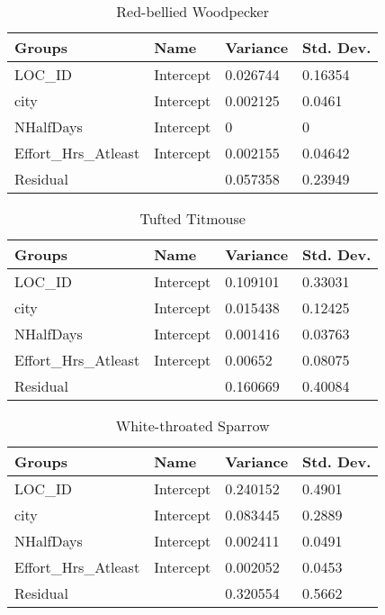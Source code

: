 \begin{longtable}[c]{|l|l|l|l|}
\caption{Red-bellied Woodpecker}
\label{my-label}\\
\hline
Groups               & Name      & Variance & Std. Dev. \\ \hline
\endhead
%
LOC\_ID              & Intercept & 0.026744 & 0.16354   \\ \hline
city                 & Intercept & 0.002125 & 0.0461    \\ \hline
NHalfDays            & Intercept & 0        & 0         \\ \hline
Effort\_Hrs\_Atleast & Intercept & 0.002155 & 0.04642   \\ \hline
Residual             &           & 0.057358 & 0.23949   \\ \hline
\end{longtable}

\begin{longtable}[c]{|l|l|l|l|}
\caption{Tufted Titmouse}
\label{my-label}\\
\hline
Groups               & Name      & Variance & Std. Dev. \\ \hline
\endhead
%
LOC\_ID              & Intercept & 0.109101 & 0.33031   \\ \hline
city                 & Intercept & 0.015438 & 0.12425   \\ \hline
NHalfDays            & Intercept & 0.001416 & 0.03763   \\ \hline
Effort\_Hrs\_Atleast & Intercept & 0.00652  & 0.08075   \\ \hline
Residual             &           & 0.160669 & 0.40084   \\ \hline
\end{longtable}

\begin{longtable}[c]{|l|l|l|l|}
\caption{White-throated Sparrow}
\label{my-label}\\
\hline
Groups               & Name      & Variance & Std. Dev. \\ \hline
\endhead
%
LOC\_ID              & Intercept & 0.240152 & 0.4901    \\ \hline
city                 & Intercept & 0.083445 & 0.2889    \\ \hline
NHalfDays            & Intercept & 0.002411 & 0.0491    \\ \hline
Effort\_Hrs\_Atleast & Intercept & 0.002052 & 0.0453    \\ \hline
Residual             &           & 0.320554 & 0.5662    \\ \hline
\end{longtable}

